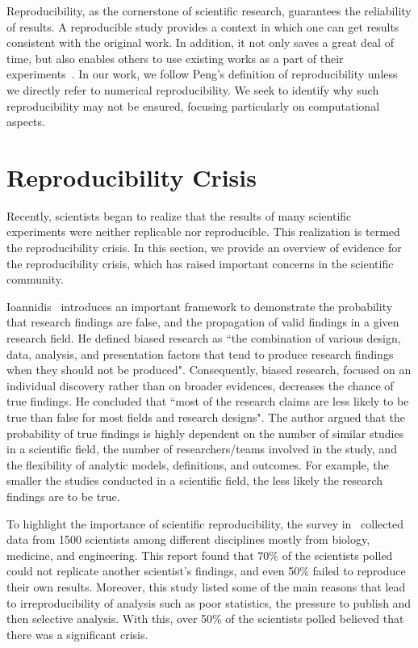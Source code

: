 Reproducibility, as the cornerstone of scientific research, guarantees 
the reliability of results. A reproducible study provides a context in which one can get results consistent with the original work.
In addition, it not only saves a great deal of time, but also 
enables others to use existing works as a part of their 
experiments~\cite{plesser2018reproducibility}. 
In our work, we follow Peng's definition of reproducibility 
unless we directly refer to numerical reproducibility. 
We seek to identify why such reproducibility may not be ensured, focusing particularly on computational aspects.

\section{Reproducibility Crisis}

Recently, scientists began to realize that the results of many 
scientific experiments were neither replicable nor reproducible. This 
realization is termed the reproducibility crisis. In this section, 
we provide an overview of evidence for the
reproducibility crisis, which has raised important concerns in the 
scientific community.

Ioannidis~\cite{ioannidis2005most} introduces an important framework to 
demonstrate the probability that research findings are false, and the 
propagation of valid findings in a given research field. He defined 
biased research as ``the combination of various design, data, analysis, 
and presentation factors that tend to produce research findings when 
they should not be produced". Consequently, biased research, focused on 
an individual discovery rather than on broader evidences, decreases the 
chance of true findings. He concluded that ``most of the research 
claims are less likely to be true than false for most fields and 
research designs". The author argued that the probability of true 
findings is highly dependent on the number of similar studies in a 
scientific field, the number of researchers/teams involved in the study, 
and the flexibility of analytic models, definitions, and outcomes. For 
example, the smaller the studies conducted in a scientific field, the 
less likely the research findings are to be true. 

To highlight the importance of scientific reproducibility, the survey 
in~\cite{baker20161} collected data from 1500 scientists among 
different disciplines mostly from  biology, medicine, and engineering. 
This report found that 70\% of the scientists polled could not 
replicate another scientist's findings, and even 50\% failed to 
reproduce their own results. Moreover, this study listed some of 
the main reasons that lead to irreproducibility of analysis 
such as poor statistics, the pressure to publish 
and then selective analysis. 
With this, over 50\% of the scientists polled believed that there was a 
significant crisis.

